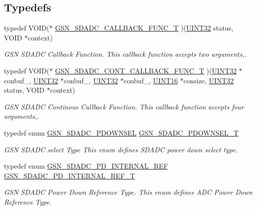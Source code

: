 \subsection*{Typedefs}
\begin{DoxyCompactItemize}
\item 
typedef VOID($\ast$ \hyperlink{a00652_ga1c7f85dc49dcc4b6c2fd8ee23dddfce6}{GSN\_\-SDADC\_\-CALLBACK\_\-FUNC\_\-T} )(\hyperlink{a00660_gae1e6edbbc26d6fbc71a90190d0266018}{UINT32} status, VOID $\ast$context)
\begin{DoxyCompactList}\small\item\em GSN SDADC Callback Function. This callback function accepts two arguments,. \end{DoxyCompactList}\item 
typedef VOID($\ast$ \hyperlink{a00652_gaaa7a87158dc8d5145295c2bc83eb4eb5}{GSN\_\-SDADC\_\-CONT\_\-CALLBACK\_\-FUNC\_\-T} )(\hyperlink{a00660_gae1e6edbbc26d6fbc71a90190d0266018}{UINT32} $\ast$conbuf\_, \hyperlink{a00660_gae1e6edbbc26d6fbc71a90190d0266018}{UINT32} $\ast$conbuf\_, \hyperlink{a00660_gae1e6edbbc26d6fbc71a90190d0266018}{UINT32} $\ast$conbuf\_, \hyperlink{a00660_ga09f1a1fb2293e33483cc8d44aefb1eb1}{UINT16} $\ast$consize, \hyperlink{a00660_gae1e6edbbc26d6fbc71a90190d0266018}{UINT32} status, VOID $\ast$context)
\begin{DoxyCompactList}\small\item\em GSN SDADC Continous Callback Function. This callback function accepts four arguments,. \end{DoxyCompactList}\item 
typedef enum \hyperlink{a00652_ga8981092cc91f6707abd5185868f1250c}{GSN\_\-SDADC\_\-PDOWNSEL} \hyperlink{a00652_gaa6002bca137b8b6b143379be96c9564b}{GSN\_\-SDADC\_\-PDOWNSEL\_\-T}
\begin{DoxyCompactList}\small\item\em GSN SDADC select Type This enum defines SDADC power down select type. \end{DoxyCompactList}\item 
typedef enum \hyperlink{a00652_ga3fd8f1ef5efcdbab4b29cdd40ca09a32}{GSN\_\-SDADC\_\-PD\_\-INTERNAL\_\-REF} \hyperlink{a00652_ga05b970e216458c5062bbef89f323a2cf}{GSN\_\-SDADC\_\-PD\_\-INTERNAL\_\-REF\_\-T}
\begin{DoxyCompactList}\small\item\em GSN SDADC Power Down Reference Type. This enum defines ADC Power Down Reference Type. \end{DoxyCompactList}\item 

\end{DoxyCompactItemize}
